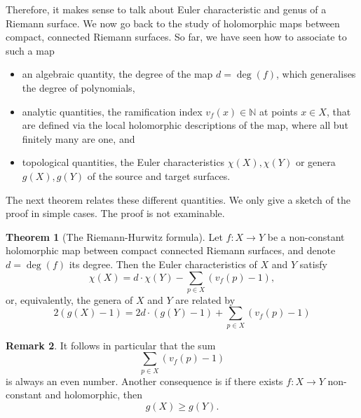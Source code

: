 \documentclass{article}
\newcommand{\N}{\mathbb{N}}
\newcommand{\rb}[1]{\left( #1 \right)}
\theoremstyle{definition}\newtheorem{definition}{Definition}[section]
\theoremstyle{definition}\newtheorem{notation}[definition]{Notation}
\theoremstyle{definition}\newtheorem{remark}[definition]{Remark}
\theoremstyle{definition}\newtheorem{example1}[definition]{Example}
\theoremstyle{definition}\newtheorem{fact}{Fact}
\theoremstyle{definition}\newtheorem{exercise}{Exercise}
\theoremstyle{definition}\newtheorem*{example2}{Example}
\newtheorem{theorem}[definition]{Theorem}
\begin{document}
Therefore, it makes sense to talk about Euler characteristic and genus of a Riemann surface. We now go back to the study of holomorphic maps between compact, connected Riemann surfaces. So far, we have seen how to associate to such a map
\begin{itemize}
\item an algebraic quantity, the degree of the map $ d = \deg\rb{f} $, which generalises the degree of polynomials,
\item analytic quantities, the ramification index $ v_f\rb{x} \in \N $ at points $ x \in X $, that are defined via the local holomorphic descriptions of the map, where all but finitely many are one, and
\item topological quantities, the Euler characteristics $ \chi\rb{X}, \chi\rb{Y} $ or genera $ g\rb{X}, g\rb{Y} $ of the source and target surfaces.
\end{itemize}
The next theorem relates these different quantities. We only give a sketch of the proof in simple cases. The proof is not examinable.

\begin{theorem}[The Riemann-Hurwitz formula]
Let $ f : X \to Y $ be a non-constant holomorphic map between compact connected Riemann surfaces, and denote $ d = \deg\rb{f} $ its degree. Then the Euler characteristics of $ X $ and $ Y $ satisfy
$$ \chi\rb{X} = d \cdot \chi\rb{Y} - \sum_{p \in X} \rb{v_f\rb{p} - 1}, $$
or, equivalently, the genera of $ X $ and $ Y $ are related by
$$ 2\rb{g\rb{X} - 1} = 2d \cdot \rb{g\rb{Y} - 1} + \sum_{p \in X} \rb{v_f\rb{p} - 1} $$
\end{theorem}

\begin{remark}
It follows in particular that the sum
$$ \sum_{p \in X} \rb{v_f\rb{p} - 1} $$
is always an even number. Another consequence is if there exists $ f : X \to Y $ non-constant and holomorphic, then
$$ g\rb{X} \ge g\rb{Y}. $$
\end{remark}
\end{document}
